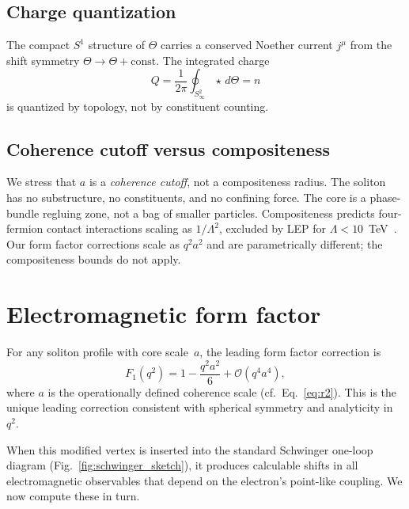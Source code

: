 ﻿\documentclass[a4paper,12pt]{article}
\newcommand{\order}[1]{\mathcal{O}(#1)}
\begin{document}
\subsection{Charge quantization}

The compact $S^1$ structure of $\Theta$ carries a conserved Noether
current $j^\mu$ from the shift symmetry $\Theta\to\Theta+\text{const}$.
The integrated charge
\begin{equation}
  Q = \frac{1}{2\pi}\oint_{S^2_\infty}\star\,d\Theta = n
\end{equation}
is quantized by topology, not by constituent counting.

\subsection{Coherence cutoff versus compositeness}

We stress that $a$ is a \emph{coherence cutoff}, not a compositeness
radius.  The soliton has no substructure, no constituents, and no
confining force.  The core is a phase-bundle regluing zone, not a bag
of smaller particles.  Compositeness predicts four-fermion contact
interactions scaling as $1/\Lambda^2$, excluded by LEP for
$\Lambda<10$~TeV~\cite{LEPcomp}.  Our form factor corrections scale
as $q^2a^2$ and are parametrically different; the compositeness bounds
do not apply.

\section{Electromagnetic form factor}
\label{sec:formfactor}

For any soliton profile with core scale~$a$, the leading form factor
correction is
\begin{equation}
  F_1(q^2) = 1 - \frac{q^2 a^2}{6} + \order{q^4 a^4},
  \label{eq:ff}
\end{equation}
where $a$ is the operationally defined coherence scale
(cf.\ Eq.~\eqref{eq:r2}).  This is the unique leading correction
consistent with spherical symmetry and analyticity in~$q^2$.

When this modified vertex is inserted into the standard Schwinger
one-loop diagram (Fig.~\ref{fig:schwinger_sketch}), it produces
calculable shifts in all electromagnetic observables that depend on
the electron's point-like coupling.  We now compute these in turn.
\end{document}
